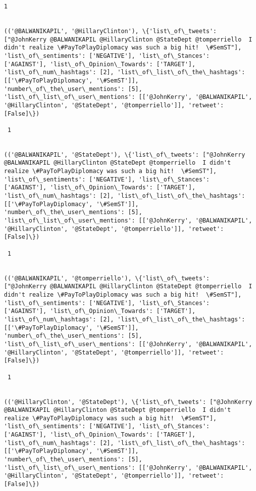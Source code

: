 \documentclass[11pt]{article}
\begin{document}
\begin{Verbatim}[commandchars=\\\{\}]
 1
 

(('@BALWANIKAPIL', '@HillaryClinton'), \{'list\_of\_tweets': ["@JohnKerry @BALWANIKAPIL @HillaryClinton @StateDept @tomperriello  I didn't realize \#PayToPlayDiplomacy was such a big hit!  \#SemST"], 'list\_of\_sentiments': ['NEGATIVE'], 'list\_of\_Stances': ['AGAINST'], 'list\_of\_Opinion\_Towards': ['TARGET'], 'list\_of\_num\_hashtags': [2], 'list\_of\_list\_of\_the\_hashtags': [['\#PayToPlayDiplomacy', '\#SemST']], 'number\_of\_the\_user\_mentions': [5], 'list\_of\_list\_of\_user\_mentions': [['@JohnKerry', '@BALWANIKAPIL', '@HillaryClinton', '@StateDept', '@tomperriello']], 'retweet': [False]\})

 1
 

(('@BALWANIKAPIL', '@StateDept'), \{'list\_of\_tweets': ["@JohnKerry @BALWANIKAPIL @HillaryClinton @StateDept @tomperriello  I didn't realize \#PayToPlayDiplomacy was such a big hit!  \#SemST"], 'list\_of\_sentiments': ['NEGATIVE'], 'list\_of\_Stances': ['AGAINST'], 'list\_of\_Opinion\_Towards': ['TARGET'], 'list\_of\_num\_hashtags': [2], 'list\_of\_list\_of\_the\_hashtags': [['\#PayToPlayDiplomacy', '\#SemST']], 'number\_of\_the\_user\_mentions': [5], 'list\_of\_list\_of\_user\_mentions': [['@JohnKerry', '@BALWANIKAPIL', '@HillaryClinton', '@StateDept', '@tomperriello']], 'retweet': [False]\})

 1
 

(('@BALWANIKAPIL', '@tomperriello'), \{'list\_of\_tweets': ["@JohnKerry @BALWANIKAPIL @HillaryClinton @StateDept @tomperriello  I didn't realize \#PayToPlayDiplomacy was such a big hit!  \#SemST"], 'list\_of\_sentiments': ['NEGATIVE'], 'list\_of\_Stances': ['AGAINST'], 'list\_of\_Opinion\_Towards': ['TARGET'], 'list\_of\_num\_hashtags': [2], 'list\_of\_list\_of\_the\_hashtags': [['\#PayToPlayDiplomacy', '\#SemST']], 'number\_of\_the\_user\_mentions': [5], 'list\_of\_list\_of\_user\_mentions': [['@JohnKerry', '@BALWANIKAPIL', '@HillaryClinton', '@StateDept', '@tomperriello']], 'retweet': [False]\})

 1
 

(('@HillaryClinton', '@StateDept'), \{'list\_of\_tweets': ["@JohnKerry @BALWANIKAPIL @HillaryClinton @StateDept @tomperriello  I didn't realize \#PayToPlayDiplomacy was such a big hit!  \#SemST"], 'list\_of\_sentiments': ['NEGATIVE'], 'list\_of\_Stances': ['AGAINST'], 'list\_of\_Opinion\_Towards': ['TARGET'], 'list\_of\_num\_hashtags': [2], 'list\_of\_list\_of\_the\_hashtags': [['\#PayToPlayDiplomacy', '\#SemST']], 'number\_of\_the\_user\_mentions': [5], 'list\_of\_list\_of\_user\_mentions': [['@JohnKerry', '@BALWANIKAPIL', '@HillaryClinton', '@StateDept', '@tomperriello']], 'retweet': [False]\})


\end{Verbatim}
\end{document}
